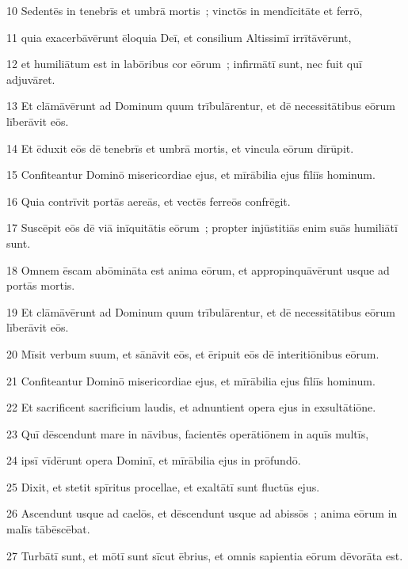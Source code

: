 \psalmVerse
  {\phantom{0}10}
  {Sedentēs in tenebrīs et umbrā mortis~; vinctōs in mendīcitāte et ferrō,}


\psalmVerse
  {\phantom{0}11}
  {quia exacerbāvērunt ēloquia Deī, et consilium Altissimī irrītāvērunt,}


\psalmVerse
  {\phantom{0}12}
  {et humiliātum est in labōribus cor eōrum~; infirmātī sunt, nec fuit quī adjuvāret.}


\psalmVerse
  {\phantom{0}13}
  {Et clāmāvērunt ad Dominum quum trībulārentur, et dē necessitātibus eōrum līberāvit eōs.}


\psalmVerse
  {\phantom{0}14}
  {Et ēduxit eōs dē tenebrīs et umbrā mortis, et vincula eōrum dīrūpit.}


\psalmVerse
  {\phantom{0}15}
  {Confiteantur Dominō misericordiae ejus, et mīrābilia ejus fīliīs hominum.}


\psalmVerse
  {\phantom{0}16}
  {Quia contrīvit portās aereās, et vectēs ferreōs confrēgit.}


\psalmVerse
  {\phantom{0}17}
  {Suscēpit eōs dē viā inīquitātis eōrum~; propter injūstitiās enim suās humiliātī sunt.}


\psalmVerse
  {\phantom{0}18}
  {Omnem ēscam abōmināta est anima eōrum, et appropinquāvērunt usque ad portās mortis.}


\psalmVerse
  {\phantom{0}19}
  {Et clāmāvērunt ad Dominum quum trībulārentur, et dē necessitātibus eōrum līberāvit eōs.}


\psalmVerse
  {\phantom{0}20}
  {Mīsit verbum suum, et sānāvit eōs, et ēripuit eōs dē interitiōnibus eōrum.}


\psalmVerse
  {\phantom{0}21}
  {Confiteantur Dominō misericordiae ejus, et mīrābilia ejus fīliīs hominum.}


\psalmVerse
  {\phantom{0}22}
  {Et sacrificent sacrificium laudis, et adnuntient opera ejus in exsultātiōne.}


\psalmVerse
  {\phantom{0}23}
  {Quī dēscendunt mare in nāvibus, facientēs operātiōnem in aquīs multīs,}


\psalmVerse
  {\phantom{0}24}
  {ipsī vīdērunt opera Dominī, et mīrābilia ejus in prōfundō.}


\psalmVerse
  {\phantom{0}25}
  {Dixit, et stetit spīritus procellae, et exaltātī sunt fluctūs ejus.}


\psalmVerse
  {\phantom{0}26}
  {Ascendunt usque ad caelōs, et dēscendunt usque ad abissōs~; anima eōrum in malīs tābēscēbat.}


\psalmVerse
  {\phantom{0}27}
  {Turbātī sunt, et mōtī sunt sīcut ēbrius, et omnis sapientia eōrum dēvorāta est.}


